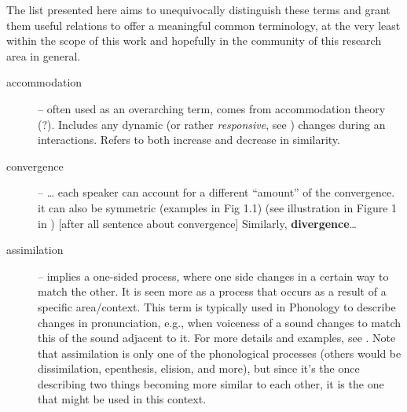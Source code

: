 The list presented here aims to unequivocally distinguish these terms and grant them useful relations to offer a meaningful common terminology, at the very least within the scope of this work and hopefully in the community of this research area in general.

\begin{description}
	\item[accommodation] -- often used as an overarching term, comes from accommodation theory (?). Includes any dynamic (or rather \emph{responsive}, see ) changes during an interactions.
	Refers to both increase and decrease in similarity.
	
	\item[convergence] -- \ldots
	each speaker can account for a different \enquote{amount} of the convergence.
	it can also be symmetric (examples in Fig 1.1)
	(see illustration in Figure 1 in \citet{Levitan2011measuring})
	[after all sentence about convergence] Similarly, \textbf{divergence}\ldots
	
	\item[assimilation] -- implies a one-sided process, where one side changes in a certain way to match the other.
	It is seen more as a process that occurs as a result of a specific area/context.
	This term is typically used in Phonology to describe changes in pronunciation, e.g., when voiceness of a sound changes to match this of the sound adjacent to it.
	For more details and examples, see \citet[][pp.\ 89-98]{Hall2011phonologie}.
	Note that assimilation is only one of the phonological processes (others would be dissimilation, epenthesis, elision, and more), but since it's the once describing two things becoming more similar to each other, it is the one that might be used in this context.
	

\end{description}
